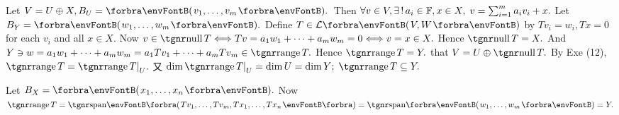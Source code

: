 Let $V=U\oplus X,B_U=\Par{v_1,\dots,v_m}.$ \,Then $\forall v\in V,\exists\,!\,a_i\in{\mathbb{F}},x\in X,\;v=\sum_{i=1}^m a_i v_i+x.$\parSol{}
Let $B_Y=\Par{w_1,\dots,w_m}.$ Define $T\in\Lm{V,W}$ by $T{v_i}=w_i,Tx=0$ for each $v_i$ and all $x\in X.$\parSol{}
Now $v\in\null T\Longleftrightarrow Tv=a_1w_1+\dots+a_mw_m=0\Longleftrightarrow v=x\in X.$ \;Hence $\null T=X.$\parSol{}
And $Y\ni w=a_1 w_1+\dots+a_m w_m=a_1 Tv_1+\dots+a_m Tv_m\in\range T.$ \;Hence $\range T=Y.$\parSol{}
\Or \NOTICE that $V=U\oplus\null T.$ By Exe (12), $\range T=\range T\mmid_U.$\parSol{}
{\Blind{\Or}}又 $\dim\range T\mmid_U=\dim U=\dim Y;\;\range T\subseteq Y.$\par\quad
\Or Let $B_X=\Par{x_1,\dots,x_n}.$ Now $\range T=\Span[\BigPar]{Tv_1,\dots,Tv_m,Tx_1,\dots,Tx_n}=\Span{w_1,\dots,w_m}=Y.$\PfEnd
\SepLine



